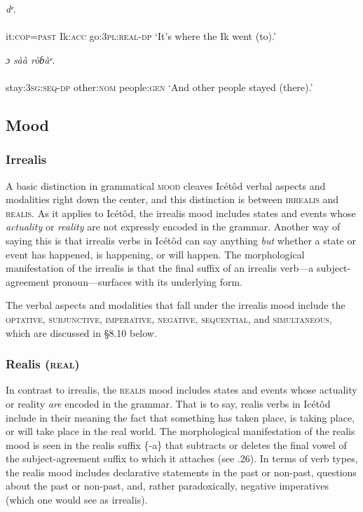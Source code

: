 \ea\label{ex:}
\textit{dᵉ}. \\
    \\
it:\textsc{cop}=\textsc{past}    Ik:\textsc{acc}   go:\textsc{3pl:real-dp}
\glt ‘It’s where the Ik went (to).’ 
\z




\ea\label{ex:}
\textit{ɔ}\textit{     sàà     ròɓàᵉ.} \\
    \\
stay:\textsc{3sg:seq-dp}   other:\textsc{nom}   people:\textsc{gen}
\glt ‘And other people stayed (there).’ 
\z






\subsection{Mood}
\subsubsection{Irrealis}

A basic distinction in grammatical \textsc{mood} cleaves Icétôd verbal aspects and modalities right down the center, and this distinction is between \textsc{irrealis} and \textsc{realis}. As it applies to Icétôd, the irrealis mood includes states and events whose \textit{actuality} or \textit{reality} are not expressly encoded in the grammar. Another way of saying this is that irrealis verbs in Icétôd can say anything \textit{but} whether a state or event has happened, is happening, or will happen. The morphological manifestation of the irrealis is that the final suffix of an irrealis verb—a subject-agreement pronoun—surfaces with its underlying form. 

The verbal aspects and modalities that fall under the irrealis mood include the \textsc{optative}, \textsc{subjunctive}, \textsc{imperative}, \textsc{negative}, \textsc{sequential}, and \textsc{simultaneous}, which are discussed in §8.10 below. 


\subsubsection{Realis (\textsc{real})}

In contrast to irrealis, the \textsc{realis} mood includes states and events whose actuality or reality \textit{are} encoded in the grammar. That is to say, realis verbs in Icétôd include in their meaning the fact that something has taken place, is taking place, or will take place in the real world. The morphological manifestation of the realis mood is seen in the realis suffix \{-a\} that subtracts or deletes the final vowel of the subject-agreement suffix to which it attaches (see .26). In terms of verb types, the realis mood includes declarative statements in the past or non-past, questions about the past or non-past, and, rather paradoxically, negative imperatives (which one would see as irrealis).




